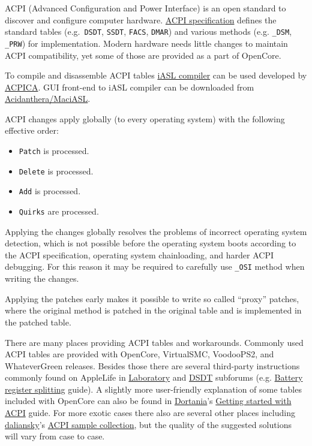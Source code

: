 \documentclass[]{article}
\providecommand{\tightlist}{%
  \setlength{\itemsep}{0pt}\setlength{\parskip}{0pt}}
\begin{document}
ACPI (Advanced Configuration and Power Interface) is an open standard to
discover and configure computer hardware.
\href{https://uefi.org/specifications}{ACPI specification} defines the
standard tables (e.g.~\texttt{DSDT}, \texttt{SSDT}, \texttt{FACS}, \texttt{DMAR})
and various methods (e.g. \texttt{\_DSM}, \texttt{\_PRW}) for implementation.
Modern hardware needs little changes to maintain ACPI compatibility, yet
some of those are provided as a part of OpenCore.

To compile and disassemble ACPI tables \href{https://github.com/acpica/acpica}{iASL compiler}
can be used developed by \href{https://www.acpica.org}{ACPICA}. GUI front-end to iASL compiler
can be downloaded from \href{https://github.com/acidanthera/MaciASL/releases}{Acidanthera/MaciASL}.

ACPI changes apply globally (to every operating system) with the following effective order:

\begin{itemize}
\tightlist
\item \texttt{Patch} is processed.
\item \texttt{Delete} is processed.
\item \texttt{Add} is processed.
\item \texttt{Quirks} are processed.
\end{itemize}

Applying the changes globally resolves the problems of incorrect operating system
detection, which is not possible before the operating system boots according to
the ACPI specification, operating system chainloading, and harder ACPI debugging.
For this reason it may be required to carefully use \texttt{\_OSI} method when
writing the changes.

Applying the patches early makes it possible to write so called ``proxy'' patches,
where the original method is patched in the original table and is implemented in
the patched table.

There are many places providing ACPI tables and workarounds. Commonly used
ACPI tables are provided with OpenCore, VirtualSMC, VoodooPS2, and WhateverGreen
releases. Besides those there are several third-party instructions commonly found
on AppleLife in \href{https://applelife.ru/forums/xakintosh.67}{Laboratory}
and \href{https://applelife.ru/forums/dsdt.129}{DSDT} subforums
(e.g. \href{https://applelife.ru/posts/498967}{Battery register splitting} guide).
A slightly more user-friendly explanation of some tables included with OpenCore
can also be found in \href{https://dortania.github.io}{Dortania}'s
\href{https://dortania.github.io/Getting-Started-With-ACPI}{Getting started with ACPI} guide.
For more exotic cases there also are several other places including
\href{https://github.com/daliansky}{daliansky}'s
\href{https://github.com/daliansky/OC-little}{ACPI sample collection}, but the quality
of the suggested solutions will vary from case to case.
\end{document}
